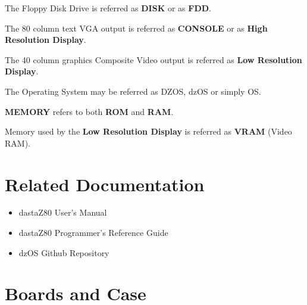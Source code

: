 \documentclass[a4paper,11pt]{article}
\begin{document}
    The Floppy Disk Drive is referred as \textbf{DISK} or as \textbf{FDD}.

    The 80 column text VGA output is referred as \textbf{CONSOLE} or as
    \textbf{High Resolution Display}.

    The 40 column graphics Composite Video output is referred as \textbf{Low
    Resolution Display}.

    The Operating System may be referred as DZOS, dzOS or simply OS.

    \textbf{MEMORY} refers to both \textbf{ROM} and \textbf{RAM}.

    Memory used by the \textbf{Low Resolution Display} is referred as
    \textbf{VRAM} (Video RAM).

    \pagebreak
    \section*{Related Documentation}
    \begin{itemize}
        \item dastaZ80 User's Manual\cite{dastaz80userman}
        \item dastaZ80 Programmer's Reference Guide\cite{dastaz80progref}
        \item dzOS Github Repository\cite{dastaZ80github}
    \end{itemize}

    \pagebreak
    \tableofcontents

    \pagebreak
    \pagestyle{fancy}
    \fancyhf{}
    \fancyfoot[R]{\thepage}
    \setcounter{page}{1}

    \section{Boards and Case}
\end{document}
